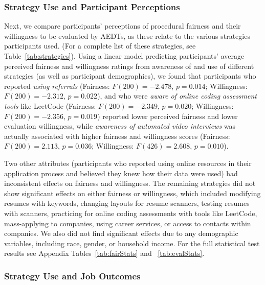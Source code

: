  \subsubsection{Strategy Use and Participant Perceptions}
Next, we compare participants' perceptions of procedural fairness and their willingness to be evaluated by AEDTs, as these relate to the various strategies participants used. (For a complete list of these strategies, see Table~\ref{tab:strategies}). 
Using a linear model predicting participants' average perceived fairness and willingness ratings from awareness of and use of different strategies (as well as participant demographics), we found that participants who reported \textit{using referrals} (Fairness: $F(200) = -2.478$, $p = 0.014$; Willingness: $F(200) = -2.312$, $p = 0.022$), and who were \textit{aware of online coding assessment tools} like LeetCode (Fairness: $F(200) = -2.349$, $p = 0.020$; Willingness: $F(200) = -2.356$, $p = 0.019$) reported lower perceived fairness and lower evaluation willingness, while \textit{awareness of automated video interviews} was actually associated with higher fairness and willingness scores (Fairness: $F(200) = 2.113$, $p = 0.036$; Willingness: $F(426) = 2.608$, $p = 0.010$).

Two other attributes (participants who reported using online resources in their application process and believed they knew how their data were used) had inconsistent effects on fairness and willingness. The remaining strategies did not  show significant effects on either fairness or willingness, which included modifying resumes with keywords, changing layouts for resume scanners, testing resumes with scanners, practicing for online coding assessments with tools like LeetCode, mass-applying to companies, using career services, or access to contacts within companies. We also did not find significant effects due to any demographic variables, including race, gender, or household income. For the full statistical test results see Appendix Tables~\ref{tab:fairStats} and ~\ref{tab:evalStats}.

\subsubsection{Strategy Use and Job Outcomes}

